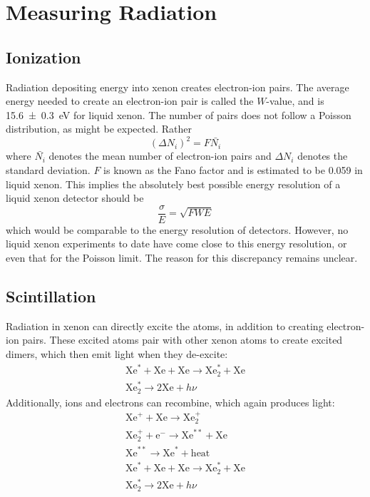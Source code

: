\documentclass[herrin-thesis.tex]{subfiles}
\begin{document}
\section{Measuring Radiation}
\subsection{Ionization}
Radiation depositing energy into xenon creates electron-ion pairs. The average energy needed to create an electron-ion pair is called the \(W\)-value, and is \SI{15.6\pm0.3}{\eV}\cite{Takahashi:1975kx} for liquid xenon. The number of pairs does not follow a Poisson distribution, as might be expected. Rather
\begin{equation}
\left (\Delta N_i \right)^2 = F \bar{N_i}
\end{equation}
where \(\bar{N_i}\) denotes the mean number of electron-ion pairs and \(\Delta N_i\) denotes the standard deviation. \(F\) is known as the Fano factor\cite{Fano:1947ys} and is estimated to be 0.059 in liquid xenon\cite{Doke:1976vn}. This implies the absolutely best possible energy resolution of a liquid xenon detector should be  
\begin{equation}
\frac{\sigma}{E} = \sqrt{F W E}
\end{equation}
which would be comparable to the energy resolution of  detectors. However, no liquid xenon experiments to date have come close to this energy resolution, or even that for the Poisson limit. The reason for this discrepancy remains unclear.

\subsection{Scintillation}
Radiation in xenon can directly excite the atoms, in addition to creating electron-ion pairs. These excited atoms  pair with other xenon atoms to create excited dimers, which then emit light when they de-excite:
\begin{equation}
\begin{split}
\text{Xe}^{*} + \text{Xe} + \text{Xe} \rightarrow \text{Xe}^{*}_2 + \text{Xe} \\
\text{Xe}^{*}_2 \rightarrow 2\text{Xe} + h\nu
\end{split}
\end{equation}
Additionally, ions and electrons can recombine, which again produces light:
\begin{equation}
\begin{split}
\text{Xe}^{+} + \text{Xe} \rightarrow \text{Xe}^{+}_2 \\
\text{Xe}^{+}_2 + \text{e}^{-} \rightarrow \text{Xe}^{**} + \text{Xe} \\
\text{Xe}^{**} \rightarrow \text{Xe}^{*} + \text{heat} \\
\text{Xe}^{*} + \text{Xe} + \text{Xe} \rightarrow \text{Xe}^{*}_2 + \text{Xe} \\
\text{Xe}^{*}_2 \rightarrow 2\text{Xe} + h\nu
\end{split}
\end{equation}
\end{document}
